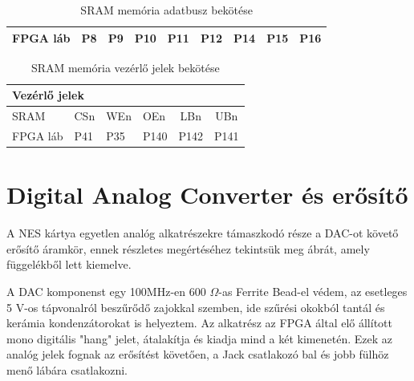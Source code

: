 \begin{table}[H]
\begin{tabular}{|lcccccccc|}
			\multicolumn{1}{|l|}{FPGA láb}                                                & \multicolumn{1}{c|}{P8}                                                 & \multicolumn{1}{c|}{P9}                                                 & \multicolumn{1}{c|}{P10}                                                & \multicolumn{1}{c|}{P11}                                                & \multicolumn{1}{c|}{P12}                                                & \multicolumn{1}{c|}{P14}                                                & \multicolumn{1}{c|}{P15}                                                & P16                        \\ \hline
		\end{tabular}
		\caption{SRAM memória adatbusz bekötése}
		\label{tab:FPGA-DATA-SRAMpin}
	\end{table}

	\begin{table}[H]
		\footnotesize
		\centering
		\begin{tabular}{|llllcc|}
			\hline
			\multicolumn{6}{|l|}{\cellcolor[HTML]{C0C0C0}\textbf{Vezérlő jelek}}                                                                                \\ \hline
			\multicolumn{1}{|l|}{SRAM}     & \multicolumn{1}{l|}{CSn} & \multicolumn{1}{l|}{WEn} & \multicolumn{1}{l|}{OEn}  & \multicolumn{1}{c|}{LBn}  & UBn  \\ \hline
			\multicolumn{1}{|l|}{FPGA láb} & \multicolumn{1}{l|}{P41} & \multicolumn{1}{l|}{P35} & \multicolumn{1}{l|}{P140} & \multicolumn{1}{c|}{P142} & P141 \\ \hline
		\end{tabular}
		\caption{SRAM memória vezérlő jelek bekötése}
		\label{tab:FPGA-CONTROL-SRAMpin}
	\end{table} 
	
\section{Digital Analog Converter és erősítő}
	
	A NES kártya egyetlen analóg alkatrészekre támaszkodó része a DAC-ot követő erősítő áramkör, ennek részletes megértéséhez tekintsük meg  ábrát, amely  függelékből lett kiemelve.
	
	A DAC komponenst egy 100MHz-en 600 $\Omega$-as Ferrite Bead-el védem, az esetleges 5 V-os tápvonalról beszűrődő zajokkal szemben, ide szűrési okokból tantál és kerámia kondenzátorokat is helyeztem. Az alkatrész az FPGA által elő állított mono digitális "hang" jelet, átalakítja és kiadja mind a két kimenetén. Ezek az analóg jelek fognak az erősítést követően, a Jack csatlakozó bal és jobb fülhöz menő lábára csatlakozni. 
	
